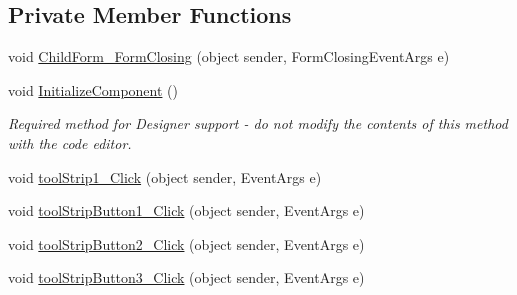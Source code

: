 \subsection*{Private Member Functions}
\begin{DoxyCompactItemize}
\item 
void \hyperlink{class__7___doroshenko__forms2__is52_1_1_task__4_a554f04a00a6726075b7d99bd45bc2754}{Child\+Form\+\_\+\+Form\+Closing} (object sender, Form\+Closing\+Event\+Args e)
\item 
void \hyperlink{class__7___doroshenko__forms2__is52_1_1_task__4_a05edfb7213a5950c11b47d82731d3b66}{Initialize\+Component} ()
\begin{DoxyCompactList}\small\item\em Required method for Designer support -\/ do not modify the contents of this method with the code editor. \end{DoxyCompactList}\item 
void \hyperlink{class__7___doroshenko__forms2__is52_1_1_task__4_a00ac51fb084a1fd508ea614f54cbe2ab}{tool\+Strip1\+\_\+\+Click} (object sender, Event\+Args e)
\item 
void \hyperlink{class__7___doroshenko__forms2__is52_1_1_task__4_aba2d8d643ee983311563a099f5f0ac12}{tool\+Strip\+Button1\+\_\+\+Click} (object sender, Event\+Args e)
\item 
void \hyperlink{class__7___doroshenko__forms2__is52_1_1_task__4_af5d8fcef07a2c9695104b7036a2e423a}{tool\+Strip\+Button2\+\_\+\+Click} (object sender, Event\+Args e)
\item 
void \hyperlink{class__7___doroshenko__forms2__is52_1_1_task__4_a69d7be2aaa5831685d50c46aaee3aef3}{tool\+Strip\+Button3\+\_\+\+Click} (object sender, Event\+Args e)
\end{DoxyCompactItemize}
